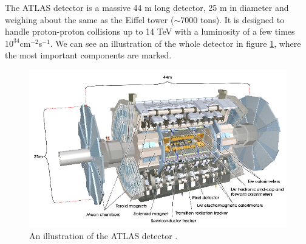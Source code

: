 The ATLAS \cite{ATLAS} detector is a massive 44 m long detector, 25 m in diameter and weighing about the same as the Eiffel tower ($\sim 7000$ tons). It is designed to handle proton-proton collisions up to 14 TeV with a luminosity of a few times $10^{34}$cm$^{-2}$s$^{-1}$. We can see an illustration of the whole detector in figure \ref{fig:atlas}, where the most important components are marked. 


\begin{figure}[H]
    \centering
    \includegraphics[width = \textwidth]{Figures/FromOnline/ATLAS.png}
    \caption{An illustration of the ATLAS detector \cite{ATLAS}.}
    \label{fig:atlas}
\end{figure}

